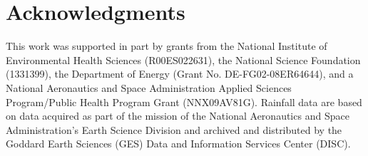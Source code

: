 \section*{Acknowledgments}

This work was supported in part by grants from the National Institute of
Environmental Health Sciences (R00ES022631), the National Science Foundation
(1331399), the Department of Energy (Grant No. DE-FG02-08ER64644), and a
National Aeronautics and Space Administration Applied Sciences Program/Public
Health Program Grant (NNX09AV81G). Rainfall data are based on data acquired as
part of the mission of the National Aeronautics and Space Administration's Earth
Science Division and archived and distributed by the Goddard Earth Sciences
(GES) Data and Information Services Center (DISC).
